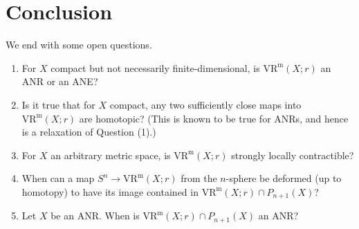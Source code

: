 \documentclass[11pt, reqno, english]{amsart}
\theoremstyle{plain}
\theoremstyle{definition}
\theoremstyle{myremark}
\newcommand{\note}[1]{\textcolor{blue}{({#1})}}
\newcommand{\vr}[2]{\mathrm{VR}(#1;#2)}
\newcommand{\vrm}[2]{\mathrm{VR}^\mathrm{m}(#1;#2)}
\begin{document}
\section{Conclusion}
\label{sec:conclusion}

We end with some open questions.

\begin{enumerate}

\item For $X$ compact but not necessarily finite-dimensional, is $\vrm{X}{r}$ an ANR or an ANE?

\item Is it true that for $X$ compact, any two sufficiently close maps into $\vrm{X}{r}$ are homotopic?
(This is known to be true for ANRs, and hence is a relaxation of Question (1).)

\item For $X$ an arbitrary metric space, is $\vrm{X}{r}$ strongly locally contractible?

\item When can a map $S^n\to \vrm{X}{r}$ from the $n$-sphere be deformed (up to homotopy) to have its image contained in $\vrm{X}{r} \cap P_{n+1}(X)$?

\item Let $X$ be an ANR.
When is $\vrm{X}{r} \cap P_{n+1}(X)$ an ANR?


\end{enumerate}





\end{document}

